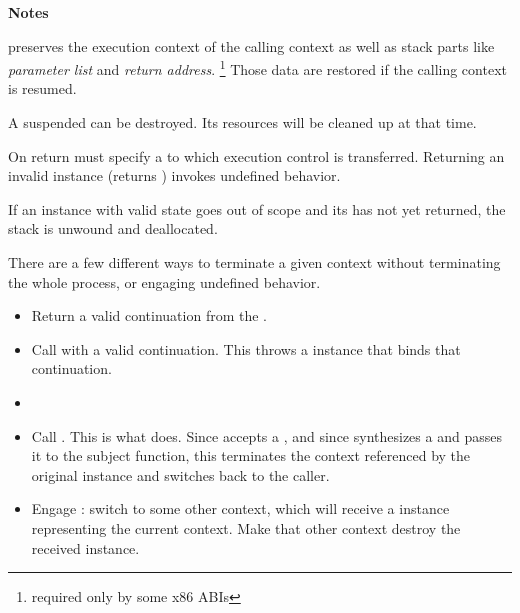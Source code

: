 {\bfseries Notes}
\begin{description}
    \item \callcc preserves the execution context of the calling context as well
          as stack parts like \emph{parameter list} and \emph{return address}.
          \footnote{required only by some x86 ABIs} Those data are restored if
          the calling context is resumed.
    \item A suspended  can be destroyed. Its resources will be
          cleaned up at that time.
    \item On return  must specify a \cont to which execution control is
          transferred. Returning an invalid \cont instance (\opbool returns
          ) invokes undefined behavior.
    \item If an instance with valid state goes out of scope and its  has
          not yet returned, the stack is unwound and deallocated.
    \item There are a few different ways to terminate a given context without
          terminating the whole process, or engaging undefined behavior.

    \begin{itemize}
        \item Return a valid continuation from the \entryfn {}.
        \item Call \unwindcont with a valid continuation. This throws a \unwindex
              instance that binds that continuation.
        \item {}
        \item Call .
              This is what \dtor does. Since \unwindcont accepts a \cont, and
              since \resumewith synthesizes a \cont and passes it to the subject
              function, this terminates the context referenced by the original
              \cont instance and switches back to the caller.
        \item Engage \dtor: switch to some other context, which will receive a
              \cont instance representing the current context. Make that other
              context destroy the received \cont instance.
    \end{itemize}
\end{description}


